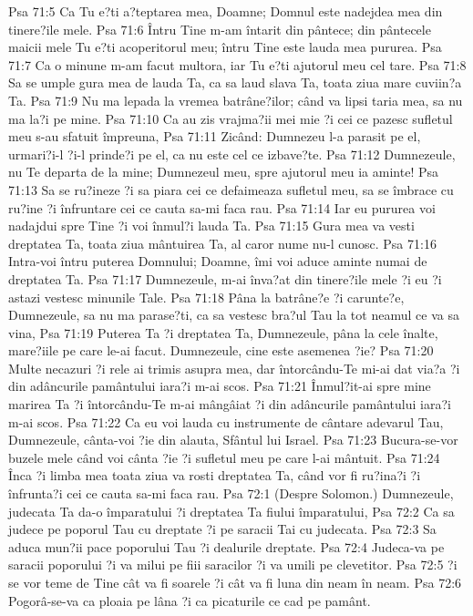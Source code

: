 Psa 71:5  Ca Tu e?ti a?teptarea mea, Doamne; Domnul este nadejdea mea din tinere?ile mele.
Psa 71:6  Întru Tine m-am întarit din pântece; din pântecele maicii mele Tu e?ti acoperitorul meu; întru Tine este lauda mea pururea.
Psa 71:7  Ca o minune m-am facut multora, iar Tu e?ti ajutorul meu cel tare.
Psa 71:8  Sa se umple gura mea de lauda Ta, ca sa laud slava Ta, toata ziua mare cuviin?a Ta.
Psa 71:9  Nu ma lepada la vremea batrâne?ilor; când va lipsi taria mea, sa nu ma la?i pe mine.
Psa 71:10  Ca au zis vrajma?ii mei mie ?i cei ce pazesc sufletul meu s-au sfatuit împreuna,
Psa 71:11  Zicând: Dumnezeu l-a parasit pe el, urmari?i-l ?i-l prinde?i pe el, ca nu este cel ce izbave?te.
Psa 71:12  Dumnezeule, nu Te departa de la mine; Dumnezeul meu, spre ajutorul meu ia aminte!
Psa 71:13  Sa se ru?ineze ?i sa piara cei ce defaimeaza sufletul meu, sa se îmbrace cu ru?ine ?i înfruntare cei ce cauta sa-mi faca rau.
Psa 71:14  Iar eu pururea voi nadajdui spre Tine ?i voi înmul?i lauda Ta.
Psa 71:15  Gura mea va vesti dreptatea Ta, toata ziua mântuirea Ta, al caror nume nu-l cunosc.
Psa 71:16  Intra-voi întru puterea Domnului; Doamne, îmi voi aduce aminte numai de dreptatea Ta.
Psa 71:17  Dumnezeule, m-ai înva?at din tinere?ile mele ?i eu ?i astazi vestesc minunile Tale.
Psa 71:18  Pâna la batrâne?e ?i carunte?e, Dumnezeule, sa nu ma parase?ti, ca sa vestesc bra?ul Tau la tot neamul ce va sa vina,
Psa 71:19  Puterea Ta ?i dreptatea Ta, Dumnezeule, pâna la cele înalte, mare?iile pe care le-ai facut. Dumnezeule, cine este asemenea ?ie?
Psa 71:20  Multe necazuri ?i rele ai trimis asupra mea, dar întorcându-Te mi-ai dat via?a ?i din adâncurile pamântului iara?i m-ai scos.
Psa 71:21  Înmul?it-ai spre mine marirea Ta ?i întorcându-Te m-ai mângâiat ?i din adâncurile pamântului iara?i m-ai scos.
Psa 71:22  Ca eu voi lauda cu instrumente de cântare adevarul Tau, Dumnezeule, cânta-voi ?ie din alauta, Sfântul lui Israel.
Psa 71:23  Bucura-se-vor buzele mele când voi cânta ?ie ?i sufletul meu pe care l-ai mântuit.
Psa 71:24  Înca ?i limba mea toata ziua va rosti dreptatea Ta, când vor fi ru?ina?i ?i înfrunta?i cei ce cauta sa-mi faca rau.
Psa 72:1  (Despre Solomon.) Dumnezeule, judecata Ta da-o împaratului ?i dreptatea Ta fiului împaratului,
Psa 72:2  Ca sa judece pe poporul Tau cu dreptate ?i pe saracii Tai cu judecata.
Psa 72:3  Sa aduca mun?ii pace poporului Tau ?i dealurile dreptate.
Psa 72:4  Judeca-va pe saracii poporului ?i va milui pe fiii saracilor ?i va umili pe clevetitor.
Psa 72:5  ?i se vor teme de Tine cât va fi soarele ?i cât va fi luna din neam în neam.
Psa 72:6  Pogorâ-se-va ca ploaia pe lâna ?i ca picaturile ce cad pe pamânt.
